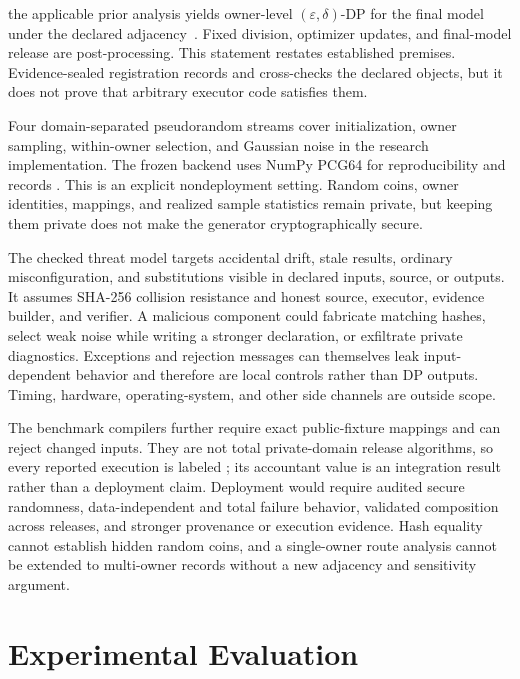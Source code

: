 the applicable prior analysis yields owner-level
\((\varepsilon,\delta)\)-DP for the final model under the declared
adjacency~\cite{wang2019subsampled,birrell2024fixed,
shenfeld2025randomallocation,dong2026optimal}.  Fixed division, optimizer updates,
and final-model release are post-processing.  This statement restates established
premises.  Evidence-sealed registration records and cross-checks the declared
objects, but it does not prove that arbitrary executor code satisfies them.

Four domain-separated pseudorandom streams cover initialization, owner sampling,
within-owner selection, and Gaussian noise in the research implementation.  The
frozen backend uses NumPy PCG64 for reproducibility and records
.  This is an explicit nondeployment setting.  Random coins,
owner identities, mappings, and realized sample statistics remain private, but
keeping them private does not make the generator cryptographically secure.

The checked threat model targets accidental drift, stale results, ordinary
misconfiguration, and substitutions visible in declared inputs, source, or
outputs.  It assumes SHA-256 collision resistance and honest source, executor,
evidence builder, and verifier.  A malicious component could fabricate matching
hashes, select weak noise while writing a stronger declaration, or exfiltrate
private diagnostics.  Exceptions and rejection messages can themselves leak
input-dependent behavior and therefore are local controls rather than DP outputs.
Timing, hardware, operating-system, and other side channels are outside scope.

The benchmark compilers further require exact public-fixture mappings and can
reject changed inputs.  They are not total private-domain release algorithms, so
every reported execution is labeled ; its accountant
value is an integration result rather than a deployment claim.  Deployment would
require audited secure randomness, data-independent and total failure behavior,
validated composition across releases, and stronger provenance or execution
evidence.  Hash equality cannot establish hidden random coins, and a single-owner
route analysis cannot be extended to multi-owner records without a new adjacency
and sensitivity argument.

\section{Experimental Evaluation}
\label{sec:ch3-evaluation}

